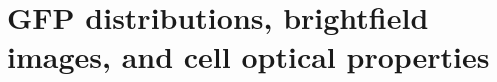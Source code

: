 
\chapter{GFP distributions, brightfield images, and cell optical properties}

\ifpdf
    \graphicspath{{Chapter5/Figs/Raster/}{Chapter5/Figs/PDF/}{Chapter5/Figs/}}
\else
    \graphicspath{{Chapter5/Figs/Vector/}{Chapter5/Figs/}}
\fi

